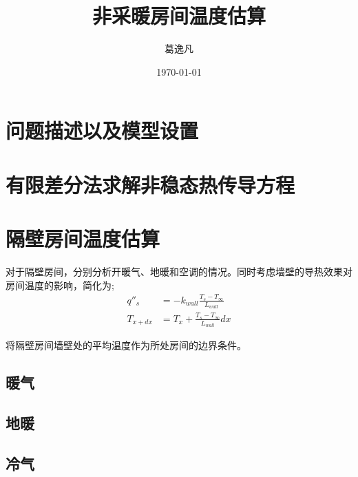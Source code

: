 \documentclass{article}
\title{\HUGEr \bf \kaishu 非采暖房间温度估算}
\author{葛逸凡 \quad 3210103331}
\date{\today}
\begin{document}
\maketitle

\tableofcontents

\newpage

\section{问题描述以及模型设置}



\section{有限差分法求解非稳态热传导方程}



\section{隔壁房间温度估算}

对于隔壁房间，分别分析开暖气、地暖和空调的情况。同时考虑墙壁的导热效果对房间温度的影响，简化为;
\begin{equation}
    \begin{aligned}
    q''_s &= -k_{wall}\frac{T_s - T_{\infty}}{L_{wall}} \\
    T_{x+dx} &= T_x +  \frac{T_s - T_{\infty}}{L_{wall}}dx
    \end{aligned}
\end{equation}
    


将隔壁房间墙壁处的平均温度作为所处房间的边界条件。

\subsection{暖气}



\subsection{地暖}



\subsection{冷气}
\end{document}
